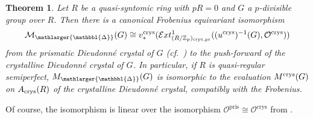 \documentclass{amsart}
\newcommand{\prism}{{\mathlarger{\mathbbl{\Delta}}}}
\theoremstyle{plain}
\newtheorem{theorem}{Theorem}[subsection]
\theoremstyle{definition}
\newcommand{\crys}{\mathrm{crys}}
\newcommand{\pris}{\mathrm{pris}}
\newcommand{\Z}{\mathbb{Z}}
\begin{document}
\begin{theorem}
  \label{sec:prism-dieud-theory-theorem-comparison-with-crystalline-dieudonne-functor}
  Let $R$ be a quasi-syntomic ring with $pR=0$ and $G$ a $p$-divisible group over $R$. Then there is a canonical Frobenius equivariant isomorphism
  $$
  \mathcal{M}_\prism(G)\cong v_\ast^{\rm crys}(\mathcal{E}xt^{1}_{(R/\Z_p)_{\crys,\mathrm{pr}}}((u^{\rm crys})^{-1}(G),\mathcal{O}^{\crys})) 
  $$
  from the prismatic Dieudonn\'e crystal of $G$ (cf.\ ) to the push-forward of the crystalline Dieudonn\'e crystal of $G$. In particular, if $R$ is quasi-regular semiperfect, $M_{\prism}(G)$ is isomorphic to the evaluation $M^{\rm crys}(G)$ on $A_{\rm crys}(R)$ of the crystalline Dieudonn\'e crystal, compatibly with the Frobenius.
\end{theorem}
Of course, the isomorphism is linear over the isomorphism $\mathcal{O}^{\pris}\cong \mathcal{O}^{\crys}$ from .
\end{document}
